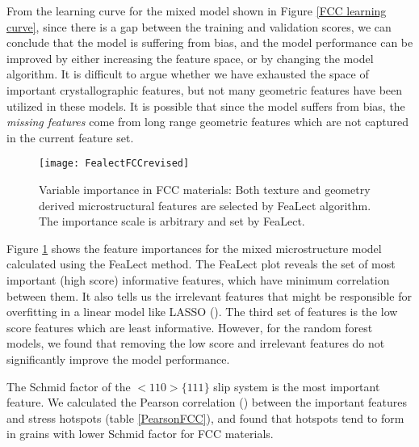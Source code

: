 \documentclass[preprint,1p,times,authoryear]{elsarticle}%
\begin{document}
From the learning curve for the mixed model shown in Figure \ref{FCC learning curve}, since there is a gap between the training and validation scores, we can conclude that the model is suffering from bias, and the model performance can be improved by either increasing the feature space, or by changing the model algorithm. It is difficult to argue whether we have exhausted the space of important crystallographic features, but not many geometric features have been utilized in these models. It is possible that since the model suffers from bias, the \textit{missing features} come from long range geometric features which are not captured in the current feature set.

\begin{figure}[!htbp]
    \centering
    \texttt{[image: FealectFCCrevised]}%
    \caption{Variable importance in FCC materials: Both texture and geometry derived microstructural features are selected by FeaLect algorithm. The importance scale is arbitrary and set by FeaLect.}
    \label{fig:LassoFCC}
\end{figure}
Figure \ref{fig:LassoFCC} shows the feature importances for the mixed microstructure model calculated using the FeaLect method. The FeaLect plot reveals the set of most important (high score) informative features, which have minimum correlation between them. It also tells us the irrelevant features that might be responsible for overfitting in a linear model like LASSO (\cite{Zare2013}). The third set of features is the low score features which are least informative. However, for the random forest models, we found that removing the low score and irrelevant features do not significantly improve the model performance.

The Schmid factor of the $<110>\{111\}$ slip system is the most important feature. We calculated the Pearson correlation (\cite{Cohen2009}) between the important features and stress hotspots (table \ref{PearsonFCC}), and found that hotspots tend to form in grains with lower Schmid factor for FCC materials. 
\end{document}
